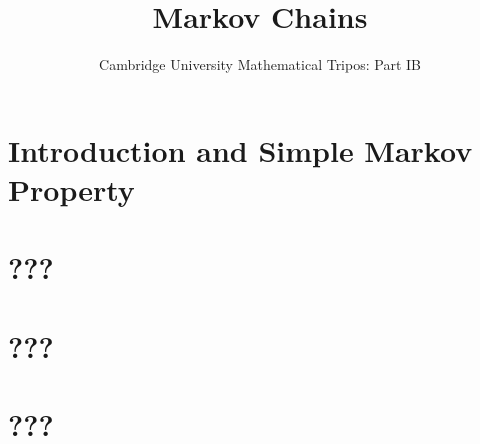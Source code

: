\documentclass{article}
\title{Markov Chains}
\author{Cambridge University Mathematical Tripos: Part IB}
\begin{document}
\maketitle

\tableofcontentsnewpage{}

\section{Introduction and Simple Markov Property}

\section{???}

\section{???}

\section{???}

\end{document}
